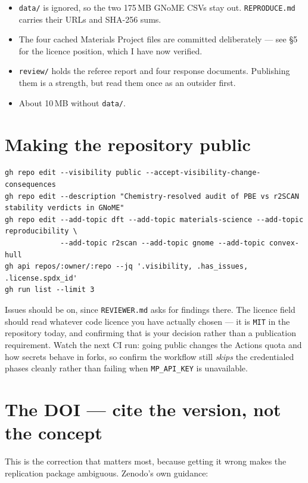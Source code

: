 \documentclass[11pt]{article}
\begin{document}
\begin{itemize}[nosep]
\item \texttt{data/} is ignored, so the two 175\,MB GNoME CSVs stay out.
      \texttt{REPRODUCE.md} carries their URLs and SHA-256 sums.
\item The four cached Materials Project files are committed deliberately --- see \S5 for the
      licence position, which I have now verified.
\item \texttt{review/} holds the referee report and four response documents. Publishing
      them is a strength, but read them once as an outsider first.
\item About 10\,MB without \texttt{data/}.
\end{itemize}

\section{Making the repository public}

\begin{Verbatim}[fontsize=\small,frame=single]
gh repo edit --visibility public --accept-visibility-change-consequences
gh repo edit --description "Chemistry-resolved audit of PBE vs r2SCAN stability verdicts in GNoME"
gh repo edit --add-topic dft --add-topic materials-science --add-topic reproducibility \
             --add-topic r2scan --add-topic gnome --add-topic convex-hull
gh api repos/:owner/:repo --jq '.visibility, .has_issues, .license.spdx_id'
gh run list --limit 3
\end{Verbatim}

Issues should be on, since \texttt{REVIEWER.md} asks for findings there. The licence field
should read whatever code licence you have actually chosen --- it is \texttt{MIT} in the
repository today, and confirming that is your decision rather than a publication
requirement. Watch the next CI run: going public changes the Actions quota and
how secrets behave in forks, so confirm the workflow still \emph{skips} the credentialed
phases cleanly rather than failing when \texttt{MP\_API\_KEY} is unavailable.

\section{The DOI --- cite the version, not the concept}

This is the correction that matters most, because getting it wrong makes the replication
package ambiguous. Zenodo's own guidance:
\end{document}
